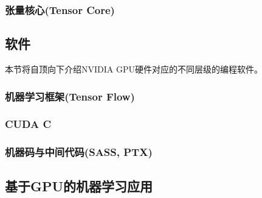 \subsubsection{张量核心(Tensor Core)}                                              
\subsection{软件}
\par 本节将自顶向下介绍NVIDIA GPU硬件对应的不同层级的编程软件。
\subsubsection{机器学习框架(Tensor Flow)}
\subsubsection{CUDA C}
\subsubsection{机器码与中间代码(SASS, PTX)}
\subsection{基于GPU的机器学习应用}